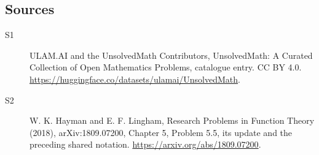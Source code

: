 \documentclass[11pt]{article}
\begin{document}
\subsection{Sources}
\begin{description}
\item[\hypertarget{source:statement:1}{S1}] ULAM.AI and the UnsolvedMath Contributors, UnsolvedMath: A Curated Collection of Open Mathematics Problems, catalogue entry. CC BY 4.0. \url{https://huggingface.co/datasets/ulamai/UnsolvedMath}.
\item[\hypertarget{source:statement:2}{S2}] W. K. Hayman and E. F. Lingham, Research Problems in Function Theory (2018), arXiv:1809.07200, Chapter 5, Problem 5.5, its update and the preceding shared notation. \url{https://arxiv.org/abs/1809.07200}.
\end{description}
\label{end:statement}
\end{document}
